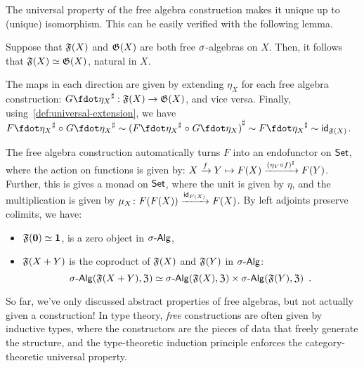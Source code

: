 The universal property of the free algebra construction makes it unique up to (unique) isomorphism.
%
This can be easily verified with the following lemma.
\begin{lemma}
    \label{lem:free-algebras-unique}
    Suppose that $\mathfrak{F}(X)$ and $\mathfrak{G}(X)$ are both free $\sigma$-algebras on $X$.
    Then, it follows that $\mathfrak{F}(X) \mathrel{\simeq} \mathfrak{G}(X)$, natural in $X$.
\end{lemma}
\begin{proofsketch}
    The maps in each direction are given by extending $\eta_X$ for each free algebra construction:
    $\ext{G\fdot\eta_{X}} : \str{F}(X) \to \str{G}(X)$, and vice versa.
    Finally, using~\cref{def:universal-extension}, we have
    \(
    \ext{F\fdot\eta_{X}} \comp \ext{G\fdot\eta_{X}} \htpy
    \ext{(\ext{F\fdot\eta_{X}} \comp G\fdot\eta_{X})} \htpy
    \ext{F\fdot\eta_{X}} \htpy
    \idfunc_{\str{F}(X)}
    \).
\end{proofsketch}
The free algebra construction automatically turns $F$ into an endofunctor on $\mathsf{Set}$,
where the action on functions is given by:
$X \xrightarrow{f} Y \mapsto F(X) \xrightarrow{{(\eta_{Y} \mathrel{\circ} f)}^{\sharp}} F(Y)$.
%
Further, this is gives a monad on $\mathsf{Set}$, where the unit is given by $\eta$,
and the multiplication is given by $\mu_{X}\colon F(F(X)) \xrightarrow{\operatorname{\mathsf{id}}_{F(X)}} F(X)$.
%
By left adjoints preserve colimits, we have:
\begin{proposition}
    \label{prop:free-algebra-colimits}
    \leavevmode
    \begin{itemize}
        \item $\mathfrak{F}({\mathbf{0}}) \mathrel{\simeq} {\mathbf{1}}$, is a zero object in $\sigAlg$,
        \item $\mathfrak{F}(X + Y)$ is the coproduct of $\mathfrak{F}(X)$ and $\mathfrak{F}(Y)$ in $\sigAlg$:
              \[
                  \sigAlg(\str{F}(X + Y), \str{Z}) \eqv
                  \sigAlg(\str{F}(X), \str{Z}) \times \sigAlg(\str{F}(Y), \str{Z})
                  \enspace.
              \]
    \end{itemize}
\end{proposition}

So far, we've only discussed abstract properties of free algebras, but not actually given a construction!
%
In type theory, \emph{free} constructions are often given by inductive types,
where the constructors are the pieces of data that freely generate the structure,
and the type-theoretic induction principle enforces the category-theoretic universal property.

